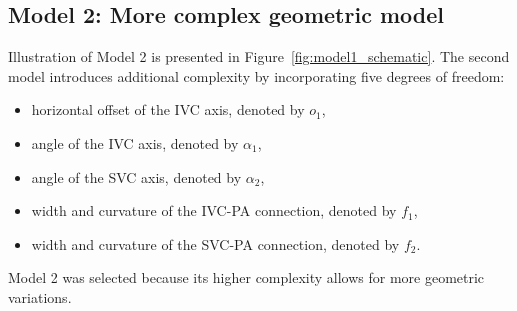 \subsection*{Model 2: More complex geometric model}\label{mod:model2}
Illustration of Model 2 is presented in Figure~\ref{fig:model1_schematic}. The second model introduces additional complexity by incorporating five degrees of freedom:
\begin{itemize}
	\item horizontal offset of the IVC axis, denoted by $o_1$,
	\item angle of the IVC axis, denoted by $\alpha_1$,
	\item angle of the SVC axis, denoted by $\alpha_2$,
	\item width and curvature of the IVC-PA connection, denoted by $f_1$,
	\item width and curvature of the SVC-PA connection, denoted by $f_2$.
\end{itemize}
Model 2 was selected because its higher complexity allows for more geometric variations.

